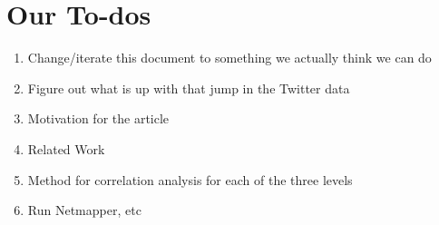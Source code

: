 \section{Our To-dos}

\begin{enumerate}
\item Change/iterate this document to something we actually think we can do
\item Figure out what is up with that jump in the Twitter data
\item Motivation for the article
\item Related Work
\item Method for correlation analysis for each of the three levels
\item Run Netmapper, etc
\end{enumerate}